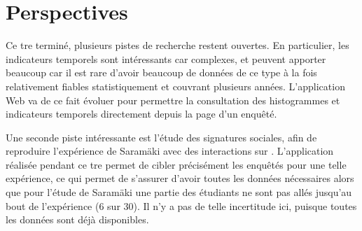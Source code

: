 
\section{Perspectives}

Ce {\sc tre} terminé, plusieurs pistes de recherche restent ouvertes. En
particulier, les indicateurs temporels sont intéressants car complexes, et
peuvent apporter beaucoup car il est rare d’avoir beaucoup de données de ce
type à la fois relativement fiables statistiquement et couvrant plusieurs
années. L’application Web va de ce fait évoluer pour permettre la consultation
des histogrammes et indicateurs temporels directement depuis la page d’un
enquêté.

Une seconde piste intéressante est l’étude des signatures sociales, afin de
reproduire l’expérience de Saram\"aki avec des interactions sur \fb{}.
L’application réalisée pendant ce {\sc tre} permet de cibler précisément les
enquêtés pour une telle expérience, ce qui permet de s’assurer d’avoir toutes
les données nécessaires alors que pour l’étude de Saram\"aki une partie
des étudiants ne sont pas allés jusqu’au bout de l’expérience (6 sur 30). Il
n’y a pas de telle incertitude ici, puisque toutes les données sont déjà
disponibles.
